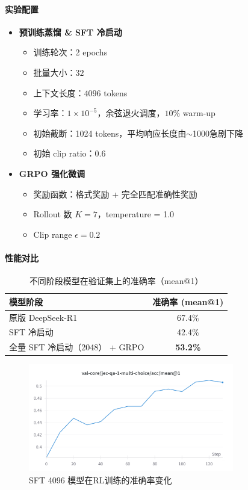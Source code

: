 \documentclass{pkuthesis}
\begin{document}
\paragraph{实验配置}  
\begin{itemize}
  \item \textbf{预训练蒸馏 \& SFT 冷启动}  
    \begin{itemize}
      \item 训练轮次：2 epochs  
      \item 批量大小：$32$  
      \item 上下文长度：$4096$ tokens  
      \item 学习率：$1\times10^{-5}$，余弦退火调度，$10\%$ warm-up  
      \item 初始截断：1024 tokens，平均响应长度由$\sim$1000急剧下降  
      \item 初始 clip ratio：$0.6$  
    \end{itemize}
  \item \textbf{GRPO 强化微调}  
    \begin{itemize}
      \item 奖励函数：格式奖励 + 完全匹配准确性奖励  
      \item Rollout 数 $K=7$，temperature = 1.0  
      \item Clip range $\epsilon = 0.2$  
    \end{itemize}
\end{itemize}

\paragraph{性能对比}  
\begin{table}[h]
  \centering
  \caption{不同阶段模型在验证集上的准确率（mean@1）}
  \label{tab:acc-distill-sft-grpo}
  \begin{tabular}{l|c}
    \hline
    模型阶段                              & 准确率 (mean@1) \\ 
    \hline
    原版 DeepSeek-R1                       & 67.4\%          \\ 
    SFT 冷启动                       & 42.4\%          \\ 
    全量 SFT 冷启动（2048） + GRPO                  & \textbf{53.2\%} \\ 
    \hline
  \end{tabular}
\end{table}
\begin{figure}[h]
  \centering
  \includegraphics[width=0.8\textwidth]{figures/sft4096.png}
  \caption{SFT 4096 模型在RL训练的准确率变化}
  \label{fig:acc-comparison}
\end{figure}
\end{document}
